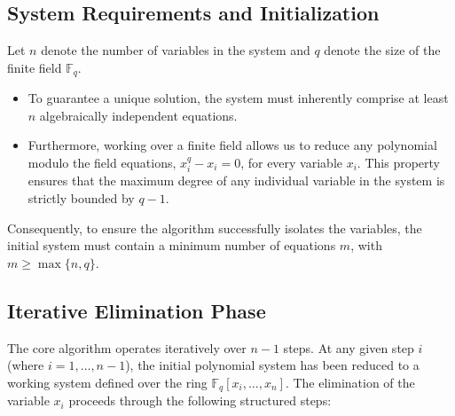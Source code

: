 
\subsection{System Requirements and Initialization}
Let $n$ denote the number of variables in the system and $q$ denote the size of the finite field $\mathbb{F}_q$.
\begin{itemize}
    \item To guarantee a unique solution, the system must inherently comprise at least $n$ algebraically independent equations.
    \item Furthermore, working over a finite field allows us to reduce any polynomial modulo the field equations, $x_i^q - x_i = 0$, for every variable $x_i$. This property ensures that the maximum degree of any individual variable in the system is strictly bounded by $q-1$.
\end{itemize}
Consequently, to ensure the algorithm successfully isolates the variables, the initial system must contain a minimum number of equations $m$, with $m \geq \max\{n, q\}$.

\subsection{Iterative Elimination Phase}
The core algorithm operates iteratively over $n-1$ steps. At any given step $i$ (where $i = 1, \dots, n-1$), the initial polynomial system has been reduced to a working system defined over the ring $\mathbb{F}_q[x_i, \dots, x_n]$. The elimination of the variable $x_i$ proceeds through the following structured steps:

